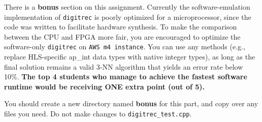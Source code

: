 \documentclass[paper=letter, fontsize=10pt]{scrartcl} %
\numberwithin{equation}{section} %
\numberwithin{figure}{section} %
\numberwithin{table}{section} %
\begin{document}
There is a \textbf{bonus} section on this assignment. 
Currently the software-emulation
implementation of \texttt{digitrec} is poorly optimized for a microprocessor,
since the code was written to facilitate hardware synthesis.
To make the comparison between the CPU and FPGA more fair, you are encouraged to
optimize the software-only \texttt{digitrec} on \texttt{AWS m4 instance}.
You can use any methods (e.g., replace HLS-specific ap\_int data types with native integer types), as long as the final solution remains a valid 3-NN algorithm that yields an error rate below 10\%. \textbf{The top 4 students who manage to achieve the fastest software runtime would be receiving ONE extra point (out of 5).}

You should create a new directory named \textbf{bonus} for this part, and
copy over any files you need. Do not make changes to \texttt{digitrec\_test.cpp}.
\end{document}
